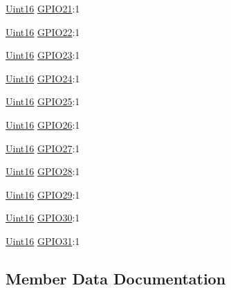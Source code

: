 \begin{DoxyCompactItemize}
\item 
\hyperlink{_d_s_p2833x___device_8h_a59a9f6be4562c327cbfb4f7e8e18f08b}{Uint16} \hyperlink{struct_g_p_a_d_a_t___b_i_t_s_adfdcbdf32e684acbc0fd0664eaa7c2f2}{G\+P\+I\+O21}\+:1
\item 
\hyperlink{_d_s_p2833x___device_8h_a59a9f6be4562c327cbfb4f7e8e18f08b}{Uint16} \hyperlink{struct_g_p_a_d_a_t___b_i_t_s_a49bdba9fe5bd1fcaa015fa2365963a85}{G\+P\+I\+O22}\+:1
\item 
\hyperlink{_d_s_p2833x___device_8h_a59a9f6be4562c327cbfb4f7e8e18f08b}{Uint16} \hyperlink{struct_g_p_a_d_a_t___b_i_t_s_a4ab19f1cbcd22e9c6da8f216483ca432}{G\+P\+I\+O23}\+:1
\item 
\hyperlink{_d_s_p2833x___device_8h_a59a9f6be4562c327cbfb4f7e8e18f08b}{Uint16} \hyperlink{struct_g_p_a_d_a_t___b_i_t_s_ab6d87fdc8e1a33ed7bcf9e0cd816031d}{G\+P\+I\+O24}\+:1
\item 
\hyperlink{_d_s_p2833x___device_8h_a59a9f6be4562c327cbfb4f7e8e18f08b}{Uint16} \hyperlink{struct_g_p_a_d_a_t___b_i_t_s_a9f48d3f001a5e646fb1805ae91ce9f07}{G\+P\+I\+O25}\+:1
\item 
\hyperlink{_d_s_p2833x___device_8h_a59a9f6be4562c327cbfb4f7e8e18f08b}{Uint16} \hyperlink{struct_g_p_a_d_a_t___b_i_t_s_aa658b5f1a60e0e1e10ebfbda9d8783fa}{G\+P\+I\+O26}\+:1
\item 
\hyperlink{_d_s_p2833x___device_8h_a59a9f6be4562c327cbfb4f7e8e18f08b}{Uint16} \hyperlink{struct_g_p_a_d_a_t___b_i_t_s_a5fd9609a9ad81f2ab7d7adf825c80a29}{G\+P\+I\+O27}\+:1
\item 
\hyperlink{_d_s_p2833x___device_8h_a59a9f6be4562c327cbfb4f7e8e18f08b}{Uint16} \hyperlink{struct_g_p_a_d_a_t___b_i_t_s_ac3267808b7af3692118e5393f55719a6}{G\+P\+I\+O28}\+:1
\item 
\hyperlink{_d_s_p2833x___device_8h_a59a9f6be4562c327cbfb4f7e8e18f08b}{Uint16} \hyperlink{struct_g_p_a_d_a_t___b_i_t_s_a98fb82d196423e4028c3ba570054258e}{G\+P\+I\+O29}\+:1
\item 
\hyperlink{_d_s_p2833x___device_8h_a59a9f6be4562c327cbfb4f7e8e18f08b}{Uint16} \hyperlink{struct_g_p_a_d_a_t___b_i_t_s_a40ad925bcdf753994505dd9b27f42c5b}{G\+P\+I\+O30}\+:1
\item 
\hyperlink{_d_s_p2833x___device_8h_a59a9f6be4562c327cbfb4f7e8e18f08b}{Uint16} \hyperlink{struct_g_p_a_d_a_t___b_i_t_s_accaf2bccc5392103755b36c7dc7cbd0d}{G\+P\+I\+O31}\+:1
\end{DoxyCompactItemize}


\subsection{Member Data Documentation}
\hypertarget{struct_g_p_a_d_a_t___b_i_t_s_ac3f5536d7a957c9c0081e67abe9b41f6}{}
